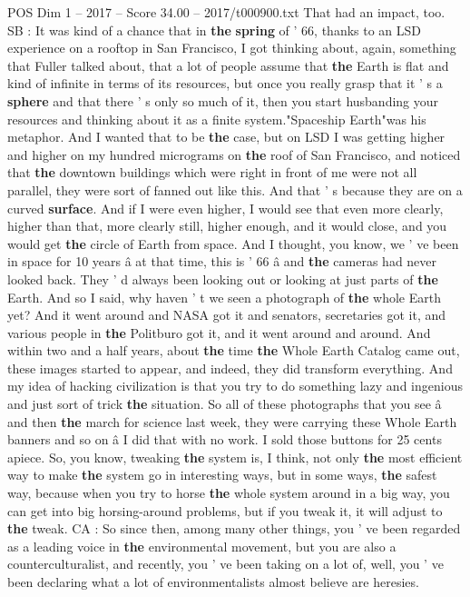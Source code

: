\begin{textsample}{POS Dim 1 – 2017 – Score 34.00 – 2017/t000900.txt}
That had an impact, too.
SB : It was kind of a chance that in \textbf{the} \textbf{spring} of ' 66, thanks to an LSD experience on a rooftop in San Francisco, I got thinking about, again, something that Fuller talked about, that a lot of people assume that \textbf{the} Earth is flat and kind of infinite in terms of its resources, but once you really grasp that it ' s a \textbf{sphere} and that there ' s only so much of it, then you start husbanding your resources and thinking about it as a finite system."Spaceship Earth"was his metaphor.
And I wanted that to be \textbf{the} case, but on LSD I was getting higher and higher on my hundred micrograms on \textbf{the} roof of San Francisco, and noticed that \textbf{the} downtown buildings which were right in front of me were not all parallel, they were sort of fanned out like this.
And that ' s because they are on a curved \textbf{surface}.
And if I were even higher, I would see that even more clearly, higher than that, more clearly still, higher enough, and it would close, and you would get \textbf{the} circle of Earth from space.
And I thought, you know, we ' ve been in space for 10 years â at that time, this is ' 66 â and \textbf{the} cameras had never looked back.
They ' d always been looking out or looking at just parts of \textbf{the} Earth.
And so I said, why haven ' t we seen a photograph of \textbf{the} whole Earth yet?
And it went around and NASA got it and senators, secretaries got it, and various people in \textbf{the} Politburo got it, and it went around and around.
And within two and a half years, about \textbf{the} time \textbf{the} Whole Earth Catalog came out, these images started to appear, and indeed, they did transform everything.
And my idea of hacking civilization is that you try to do something lazy and ingenious and just sort of trick \textbf{the} situation.
So all of these photographs that you see â and then \textbf{the} march for science last week, they were carrying these Whole Earth banners and so on â I did that with no work.
I sold those buttons for 25 cents apiece.
So, you know, tweaking \textbf{the} system is, I think, not only \textbf{the} most efficient way to make \textbf{the} system go in interesting ways, but in some ways, \textbf{the} safest way, because when you try to horse \textbf{the} whole system around in a big way, you can get into big horsing-around problems, but if you tweak it, it will adjust to \textbf{the} tweak.
CA : So since then, among many other things, you ' ve been regarded as a leading voice in \textbf{the} environmental movement, but you are also a counterculturalist, and recently, you ' ve been taking on a lot of, well, you ' ve been declaring what a lot of environmentalists almost believe are heresies.

\end{textsample}
